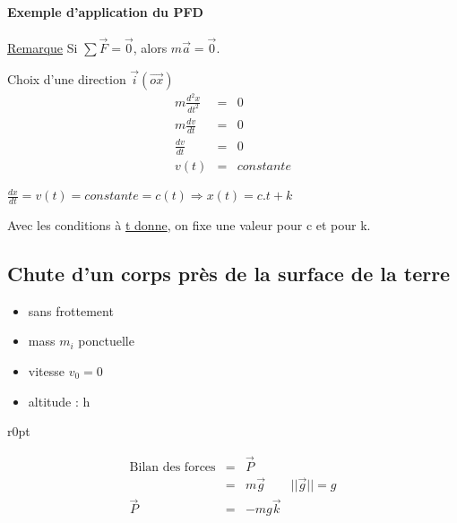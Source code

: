 \paragraph{Exemple d'application du PFD} 

\ul{Remarque} Si $\sum \vec{F}=\vec{0}$, alors $m\vec{a}=\vec{0}$.

Choix d'une direction $\vec{i} (\overrightarrow{ox})$ \[\begin{array}{rcl}
	m\frac{d^2x}{dt^2} &=& 0 \\
	m\frac{dv}{dt} &=& 0 \\
	\frac{dv}{dt} &=& 0 \\
v(t) &=& constante \end{array}\]

$\frac{dx}{dt} = v(t) = constante = c(t) \Rightarrow x(t) = c.t + k$

Avec les conditions à \ul{t donne}, on fixe une valeur pour c et pour k.

\newpage

\subsection{Chute d'un corps près de la surface de la terre}

\begin{itemize}
	\item sans frottement
	\item mass $m_i$ ponctuelle
	\item vitesse $v_0 = 0$
	\item altitude : h
\end{itemize}

\begin{wrapfigure}[5]{r}{0pt}
\end{wrapfigure}

\[\begin{array}{rclr}
	\text{Bilan des forces} &=& \vec{P} \\
					&=& m\vec{g} & ||\vec{g}||=g \\
		\vec{P} &=& -mg\vec{k}\end{array}\]

